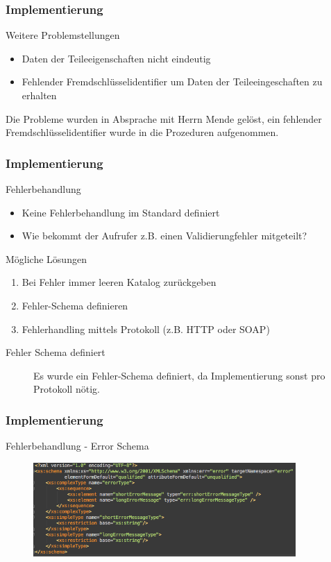 \documentclass[serif,mathserif]{beamer}
\begin{document}
\begin{frame}
  \frametitle{Implementierung}
 Weitere Problemstellungen
  \begin{itemize}
  \item Daten der Teileeigenschaften nicht eindeutig
  \item Fehlender Fremdschlüsselidentifier um Daten der Teileeingeschaften zu erhalten
  \end{itemize}
  
 Die Probleme wurden in Absprache mit Herrn Mende gelöst, ein fehlender Fremdschlüsselidentifier wurde in die Prozeduren aufgenommen. 
  
\end{frame}

\begin{frame}
  \frametitle{Implementierung}
 Fehlerbehandlung
  \begin{itemize}
  \item Keine Fehlerbehandlung im Standard definiert
  \item Wie bekommt der Aufrufer z.B. einen Validierungfehler mitgeteilt?
  \end{itemize}
  
 Mögliche Lösungen
   \begin{enumerate}
  \item Bei Fehler immer leeren Katalog zurückgeben 
  \item Fehler-Schema definieren 
  \item Fehlerhandling mittels Protokoll (z.B. HTTP oder SOAP)
  \end{enumerate}
  
  \begin{description}
\item[Fehler Schema definiert] Es wurde ein Fehler-Schema definiert, da Implementierung sonst pro Protokoll nötig. 
\end{description}

  
\end{frame}


 \begin{frame}
  \frametitle{Implementierung}
  Fehlerbehandlung - Error Schema

     \begin{figure}[t]
     \includegraphics[width=10cm]{images/ErrorSchema.png}
     \end{figure}
 \end{frame}
\end{document}
